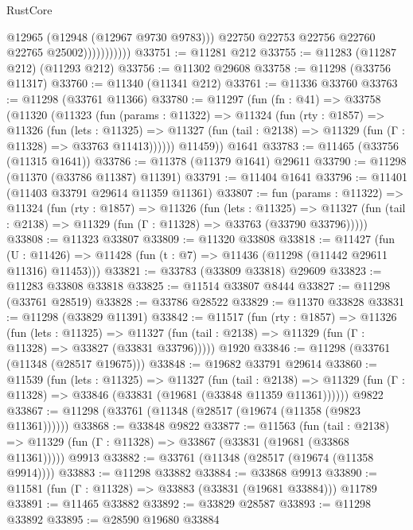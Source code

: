 \begin{lexlean}{RustCore}
\begin{coremodule}
                            @12965
                            (@12948 (@12967 @9730 @9783)))
                          @22750
                          @22753
                          @22756
                          @22760
                          @22765
                          @25002)))))))))))
@33751 := @11281 @212
@33755 := @11283 (@11287 @212) (@11293 @212)
@33756 := @11302 @29608
@33758 := @11298 (@33756 @11317)
@33760 := @11340 (@11341 @212)
@33761 := @11336 @33760
@33763 := @11298 (@33761 @11366)
@33780 := @11297
    (fun (fn : @41) =>
    @33758
      (@11320
        (@11323
          (fun (params : @11322) =>
          @11324
            (fun (rty : @1857) =>
            @11326
              (fun (lets : @11325) =>
              @11327 (fun (tail : @2138) => @11329 (fun (Γ : @11328) => @33763 @11413))))))
        @11459))
    @1641
@33783 := @11465 (@33756 (@11315 @1641))
@33786 := @11378 (@11379 @1641) @29611
@33790 := @11298 (@11370 (@33786 @11387) @11391)
@33791 := @11404 @1641
@33796 := @11401 (@11403 @33791 @29614 @11359 @11361)
@33807 := fun (params : @11322) =>
  @11324
    (fun (rty : @1857) =>
    @11326
      (fun (lets : @11325) =>
      @11327 (fun (tail : @2138) => @11329 (fun (Γ : @11328) => @33763 (@33790 @33796)))))
@33808 := @11323 @33807
@33809 := @11320 @33808
@33818 := @11427
    (fun (U : @11426) => @11428 (fun (t : @7) => @11436 (@11298 (@11442 @29611 @11316) @11453)))
@33821 := @33783 (@33809 @33818) @29609
@33823 := @11283 @33808 @33818
@33825 := @11514 @33807 @8444
@33827 := @11298 (@33761 @28519)
@33828 := @33786 @28522
@33829 := @11370 @33828
@33831 := @11298 (@33829 @11391)
@33842 := @11517
    (fun (rty : @1857) =>
    @11326
      (fun (lets : @11325) =>
      @11327 (fun (tail : @2138) => @11329 (fun (Γ : @11328) => @33827 (@33831 @33796)))))
    @1920
@33846 := @11298 (@33761 (@11348 (@28517 @19675)))
@33848 := @19682 @33791 @29614
@33860 := @11539
    (fun (lets : @11325) =>
    @11327
      (fun (tail : @2138) =>
      @11329 (fun (Γ : @11328) => @33846 (@33831 (@19681 (@33848 @11359 @11361))))))
    @9822
@33867 := @11298 (@33761 (@11348 (@28517 (@19674 (@11358 (@9823 @11361))))))
@33868 := @33848 @9822
@33877 := @11563
    (fun (tail : @2138) => @11329 (fun (Γ : @11328) => @33867 (@33831 (@19681 (@33868 @11361)))))
    @9913
@33882 := @33761 (@11348 (@28517 (@19674 (@11358 @9914))))
@33883 := @11298 @33882
@33884 := @33868 @9913
@33890 := @11581 (fun (Γ : @11328) => @33883 (@33831 (@19681 @33884))) @11789
@33891 := @11465 @33882
@33892 := @33829 @28587
@33893 := @11298 @33892
@33895 := @28590 @19680 @33884

\end{coremodule}
\end{lexlean}
